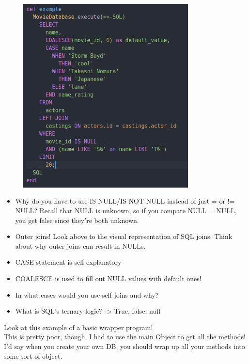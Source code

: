 \documentclass{42-en}
\begin{document}
            \begin{figure}[H]
                \begin{center}
                    \includegraphics[width=9cm]{null.png}
                \end{center}
            \end{figure}

	\begin{itemize}\itemsep1pt 
		\item Why do you have to use IS NULL/IS NOT NULL instead of just = or != NULL? 
			Recall that NULL is unknown, so if you compare NULL = NULL, you get false 
			since they're both unknown. 
		\item Outer joins! Look above to the visual representation of SQL joins. Think about 
			why outer joins can result in NULLs. 
		\item CASE statement is self explanatory
		\item COALESCE is used to fill out NULL values with default ones!   
		\item In what cases would you use self joins and why?  
		\item What is SQL's ternary logic? -> True, false, null
	\end{itemize}

	Look at this example of a basic wrapper program! \\ 
	This is pretty poor, though. I had to use the main Object to get all the methods! 
	I'd say when you create your own DB, you should wrap up all your methods into some 
	sort of object. \\ 
\end{document}
